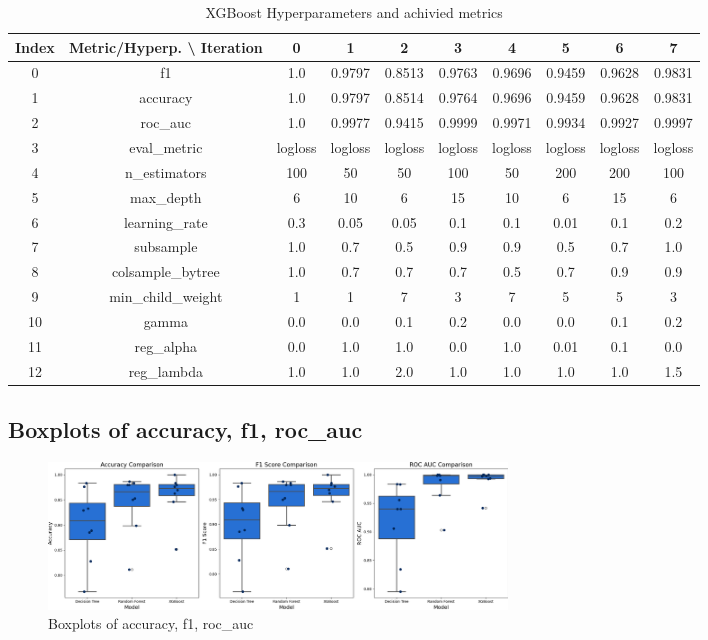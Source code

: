 \documentclass{article}%
\begin{document}
\begin{table}[h!]%
\caption{XGBoost Hyperparameters and achivied metrics}%
\vspace{0.2cm}%
\centering%
\begin{tabular}{|c||c||c||c||c||c||c||c||c||c|}%
\hline%
Index&Metric/Hyperp. \textbackslash{} Iteration&0&1&2&3&4&5&6&7\\%
\hline%
0&f1&1.0&0.9797&0.8513&0.9763&0.9696&0.9459&0.9628&0.9831\\%
1&accuracy&1.0&0.9797&0.8514&0.9764&0.9696&0.9459&0.9628&0.9831\\%
2&roc\_auc&1.0&0.9977&0.9415&0.9999&0.9971&0.9934&0.9927&0.9997\\%
3&eval\_metric&logloss&logloss&logloss&logloss&logloss&logloss&logloss&logloss\\%
4&n\_estimators&100&50&50&100&50&200&200&100\\%
5&max\_depth&6&10&6&15&10&6&15&6\\%
6&learning\_rate&0.3&0.05&0.05&0.1&0.1&0.01&0.1&0.2\\%
7&subsample&1.0&0.7&0.5&0.9&0.9&0.5&0.7&1.0\\%
8&colsample\_bytree&1.0&0.7&0.7&0.7&0.5&0.7&0.9&0.9\\%
9&min\_child\_weight&1&1&7&3&7&5&5&3\\%
10&gamma&0.0&0.0&0.1&0.2&0.0&0.0&0.1&0.2\\%
11&reg\_alpha&0.0&1.0&1.0&0.0&1.0&0.01&0.1&0.0\\%
12&reg\_lambda&1.0&1.0&2.0&1.0&1.0&1.0&1.0&1.5\\%
\hline%
\end{tabular}%
\end{table}

%
\newpage%
\subsection{Boxplots of accuracy, f1, roc\_auc}%
\label{subsec:Boxplotsofaccuracy,f1,rocauc}%


\begin{figure}[h!]%
\centering%
\includegraphics[width=460px]{ModelOptimization/box_plots_metrics.png}%
\caption{Boxplots of accuracy, f1, roc\_auc}%
\end{figure}
\end{document}

